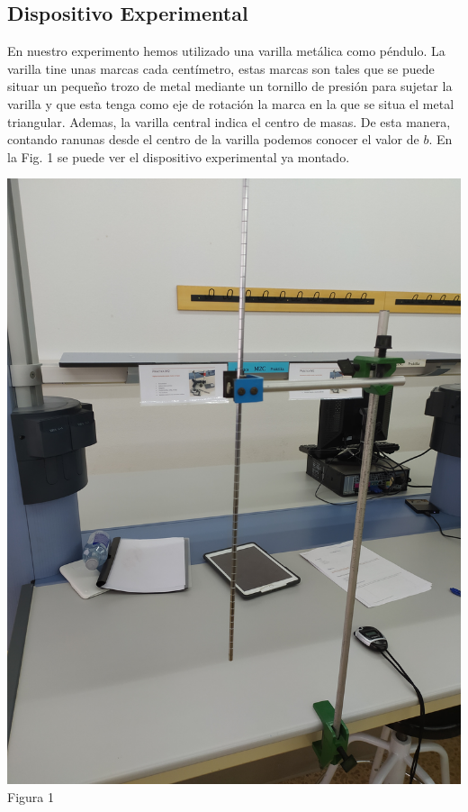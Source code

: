 \documentclass{article}
\begin{document}
\begin{multicols}{2}
\section{Dispositivo Experimental}
En nuestro experimento hemos utilizado una varilla metálica como péndulo. La varilla tine unas marcas cada centímetro, estas marcas son tales que se puede situar un pequeño trozo de metal mediante un tornillo de presión para sujetar la varilla y que esta tenga como eje de rotación la marca en la que se situa el metal triangular. Ademas, la varilla central indica el centro de masas. De esta manera, contando ranunas desde el centro de la varilla podemos conocer el valor de $b$. En la Fig. 1 se puede ver el dispositivo experimental ya montado.
\begin{center}
    \includegraphics[scale=0.05, angle=-90]{figures/c2.png}\\
    Figura 1
\end{center}


\end{multicols}
\end{document}
